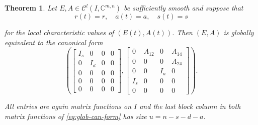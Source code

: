 \documentclass[]{book}
\newtheorem{theorem}{Theorem}[chapter]
\theoremstyle{definition}
\theoremstyle{definition}
\theoremstyle{definition}
\theoremstyle{remark}
\begin{document}
\begin{theorem}
\protect\hypertarget{thm:global-canonical-form}{}{\label{thm:global-canonical-form} }
Let \(E, A \in \mathcal C^l(I, \mathbb C^{m,n})\) be sufficiently smooth and suppose that
\begin{equation}
    r(t) = r, \quad a(t)=a, \quad s(t)=s \label{eq:glob-local-char-vals}
\end{equation}

for the local characteristic values of \((E(t), A(t))\). Then \((E, A)\) is globally equivalent to the canonical form
\begin{equation}
\left(
\begin{bmatrix}
I_s &  0  & 0 & 0 \\
0   & I_d & 0 & 0 \\
0   &  0  & 0 & 0 \\
0   &  0  & 0 & 0 \\
0   &  0  & 0 & 0
\end{bmatrix}, 
\begin{bmatrix}
0   & A_{12}&  0  & A_{14} \\
0   &   0   &  0  & A_{24} \\
0   &   0   & I_a & 0 \\
I_s &   0   &  0  & 0 \\
0   &   0   &  0  & 0
\end{bmatrix}
\right ).
\label{eq:glob-can-form}
\end{equation}

All entries are again matrix functions on \(I\) and the last block column in both matrix functions of \eqref{eq:glob-can-form} has size \(u=n-s-d-a\).
\end{theorem}
\end{document}
